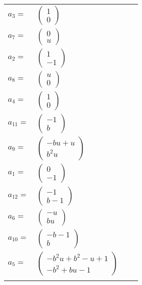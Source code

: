 \documentclass[1p]{elsarticle_modified}
\theoremstyle{definition}
\begin{document}
\begin{tabular}{m{7pt} m{180pt} m{7pt} m{180pt} }
\flushright $a_{3}=$&$\begin{pmatrix}1\\0\end{pmatrix}$ \\
\flushright $a_{7}=$&$\begin{pmatrix}0\\u\end{pmatrix}$ \\
\flushright $a_{2}=$&$\begin{pmatrix}1\\-1\end{pmatrix}$ \\
\flushright $a_{8}=$&$\begin{pmatrix}u\\0\end{pmatrix}$ \\
\flushright $a_{4}=$&$\begin{pmatrix}1\\0\end{pmatrix}$ \\
\flushright $a_{11}=$&$\begin{pmatrix}-1\\b\end{pmatrix}$ \\
\flushright $a_{9}=$&$\begin{pmatrix}- b u+u\\b^2 u\end{pmatrix}$ \\
\flushright $a_{1}=$&$\begin{pmatrix}0\\-1\end{pmatrix}$ \\
\flushright $a_{12}=$&$\begin{pmatrix}-1\\b-1\end{pmatrix}$ \\
\flushright $a_{6}=$&$\begin{pmatrix}- u\\b u\end{pmatrix}$ \\
\flushright $a_{10}=$&$\begin{pmatrix}- b-1\\b\end{pmatrix}$ \\
\flushright $a_{5}=$&$\begin{pmatrix}- b^2 u+b^2- u+1\\- b^2+b u-1\end{pmatrix}$\\&\end{tabular}
\end{document}

